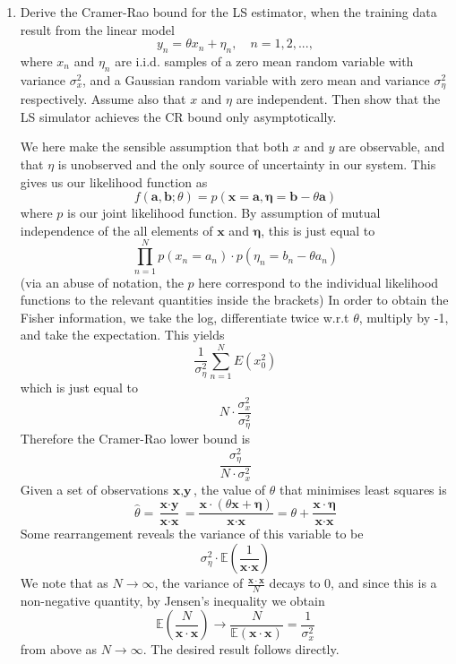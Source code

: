 \documentclass{article}
\newcommand{\chapternumber}{3}
\newenvironment{QandA}{\begin{enumerate}[label=\chapternumber.\arabic*]\bfseries\boldmath}
	{\end{enumerate}}
\newenvironment{answered}{\par\bigskip\normalfont\unboldmath}{}
\begin{document}
\begin{QandA}
\begin{answered}
			Now, if we assume that differentiation and integration can be interchanged, then this is equal to
			\[\frac{\partial}{\partial\theta}\int_{x\in X\cap\theta}p(x|\theta)\;d\mu\]
			The expression being differentiated is just the integral of the probability of all events over the probability space, and so so is just equal to 1. Therefore the derivative is equal to 0, and thus the regularity condition holds, as required.
		\end{answered}
	
		\item Derive the Cramer-Rao bound for the LS estimator, when the training data result from the linear model
		\[y_n=\theta x_n+\eta_n,\quad n=1,2,...,\]
		where $x_n$ and $\eta_n$ are i.i.d. samples of a zero mean random variable with variance $\sigma_x^2$, and a Gaussian random variable with zero mean and variance $\sigma_\eta^2$ respectively. Assume also that $x$ and $\eta$ are independent. Then show that the LS simulator achieves the CR bound only asymptotically.
		
		\begin{answered}
			We here make the sensible assumption that both $x$ and $y$ are observable, and that $\eta$ is unobserved and the only source of uncertainty in our system. This gives us our likelihood function as
			\[f(\textbf{a},\textbf{b};\theta)=p(\textbf{x}=\textbf{a},\boldsymbol{\eta}=\textbf{b}-\theta\textbf{a})\]
			where $p$ is our joint likelihood function.
			By assumption of mutual independence of the all elements of $\textbf{x}$ and $\boldsymbol{\eta}$, this is just equal to
			\[\prod_{n=1}^{N}p(x_n=a_n)\cdot p(\eta_n=b_n-\theta a_n)\]
			(via an abuse of notation, the $p$ here correspond to the individual likelihood functions to the relevant quantities inside the brackets)
			In order to obtain the Fisher information, we take the log, differentiate twice w.r.t $\theta$, multiply by -1, and take the expectation. This yields
			\[\frac{1}{\sigma_\eta^2}\sum_{n=1}^{N}E(x_0^2)\]
			which is just equal to 
			\[N\cdot\frac{\sigma_x^2}{\sigma_\eta^2}\]
			Therefore the Cramer-Rao lower bound is 
			\[\frac{\sigma_\eta^2}{N\cdot\sigma_x^2}\]
			Given a set of observations $\textbf{x},\textbf{y}$, the value of $\hat\theta$ that minimises least squares is
			\[\hat\theta = \frac{\textbf{x}\cdot\textbf{y}}{\textbf{x}\cdot\textbf{x}} = \frac{\textbf{x}\cdot(\theta \textbf{x} + \boldsymbol{\eta})}{\textbf{x}\cdot\textbf{x}} = \theta + \frac{\textbf{x}\cdot\boldsymbol{\eta}}{\textbf{x}\cdot\textbf{x}}\]
			Some rearrangement reveals the variance of this variable to be
			\[\sigma_\eta^2\cdot\mathbb{E}\left(\frac{1}{\textbf{x}\cdot \textbf{x}}\right)\]
			We note that as $N\rightarrow\infty$, the variance of $\frac{\mathbf{x}\cdot\mathbf{x}}{N}$ decays to 0, and since this is a non-negative quantity, by Jensen's inequality we obtain
			\[\mathbb{E}\left(\frac{N}{\mathbf{x}\cdot\mathbf{x}}\right)\rightarrow\frac{N}{\mathbb{E}(\mathbf{x}\cdot\mathbf{x})} = \frac{1}{\sigma_x^2}\] from above as $N\rightarrow\infty$. The desired result follows directly.
		\end{answered}
	

\end{QandA}
\end{document}
